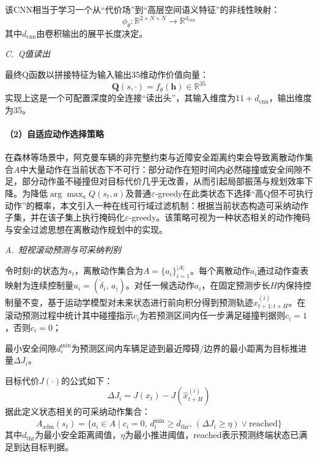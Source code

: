 \documentclass{iopjournal}
\begin{document}
该CNN相当于学习一个从``代价场''到``高层空间语义特征''的非线性映射：
\begin{equation}
  \phi_\theta: \mathbb{R}^{2 \times N \times N} \rightarrow \mathbb{R}^{d_{\text{cnn}}}
\end{equation}
其中$d_{\text{cnn}}$由卷积输出的展平长度决定。

\textit{C.~Q值读出}

最终Q函数以拼接特征为输入输出35维动作价值向量：
\begin{equation}
  \mathbf{Q}(s, \cdot) = f_\theta(\mathbf{h}) \in \mathbb{R}^{35}
\end{equation}
实现上这是一个可配置深度的全连接``读出头''，其输入维度为$11 + d_{\text{cnn}}$，输出维度为35。

\paragraph{（2）自适应动作选择策略}

在森林等场景中，阿克曼车辆的非完整约束与近障安全距离约束会导致离散动作集合$A$中大量动作在当前状态下不可行：部分动作在短时间内必然碰撞或安全间隙不足，部分动作虽不碰撞但对目标代价几乎无改善，从而引起局部振荡与规划效率下降。为降低$\arg\max_a Q(s_t, a)$及普通$\varepsilon$-greedy在此类状态下选择``高Q但不可执行动作''的概率，本文引入一种在线可行域过滤机制：根据当前状态构造可采纳动作子集，并在该子集上执行掩码化$\varepsilon$-greedy。该策略可视为一种状态相关的动作掩码与安全过滤思想在离散动作规划中的实现。

\textit{A.~短视滚动预测与可采纳判别}

令时刻$t$的状态为$s_t$，离散动作集合为$A = \{a_i\}_{i=1}^{|A|}$。每个离散动作$a_i$通过动作查表映射为连续控制量$u_i = (\dot{\delta}_i,\, a_i)$。对任一候选动作$a_i$，在固定预测步长$H$内保持控制量不变，基于运动学模型对未来状态进行前向积分得到预测轨迹$\hat{x}_{t+1:t+H}^{(i)}$。在滚动预测过程中统计其中碰撞指示$c_i$为若预测区间内任一步满足碰撞判据则$c_i = 1$，否则$c_i = 0$；

最小安全间隙$d_i^{\min}$为预测区间内车辆足迹到最近障碍/边界的最小距离为目标推进量$\Delta J_i$。

目标代价$J(\cdot)$的公式如下：
\begin{equation}
  \Delta J_i = J(x_t) - J(\hat{x}_{t+H}^{(i)})
\end{equation}
据此定义状态相关的可采纳动作集合：
\begin{equation}
  A_{\text{adm}}(s_t) = \{a_i \in A \mid c_i=0,\, d_i^{\min}\geq d_{\text{thr}},\, (\Delta J_i \geq \eta) \vee \text{reached}\}
\end{equation}
其中$d_{\text{thr}}$为最小安全距离阈值，$\eta$为最小推进阈值，reached表示预测终端状态已满足到达目标判据。
\end{document}
